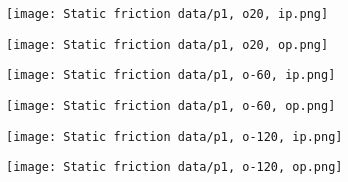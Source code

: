 \documentclass[12pt]{article}
\begin{document}
\begin{figure}[!h]
    \centering
    \begin{minipage}{0.49\textwidth}       
         \texttt{[image: Static friction data/p1, o20, ip.png]}
    \end{minipage}
    \begin{minipage}{0.49\textwidth}       
         \texttt{[image: Static friction data/p1, o20, op.png]}
    \end{minipage}

\end{figure}
\begin{figure}[!h]
    \centering
    \begin{minipage}{0.49\textwidth}       
         \texttt{[image: Static friction data/p1, o-60, ip.png]}
    \end{minipage}
    \begin{minipage}{0.49\textwidth}       
         \texttt{[image: Static friction data/p1, o-60, op.png]}
    \end{minipage}

\end{figure}
\begin{figure}[!h]
    \centering
    \begin{minipage}{0.49\textwidth}       
         \texttt{[image: Static friction data/p1, o-120, ip.png]}
    \end{minipage}
    \begin{minipage}{0.49\textwidth}       
         \texttt{[image: Static friction data/p1, o-120, op.png]}
    \end{minipage}

\end{figure}
\end{document}
